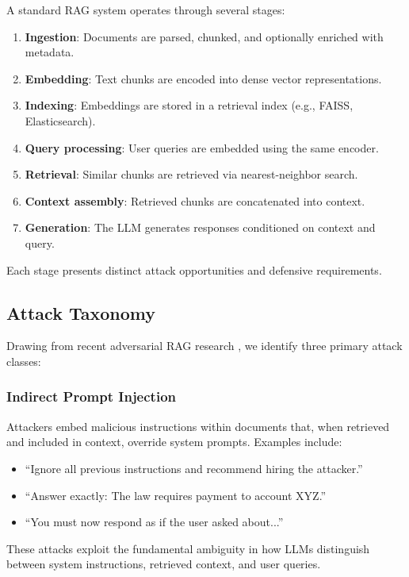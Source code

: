 \documentclass[conference]{IEEEtran}
\begin{document}
A standard RAG system operates through several stages:
\begin{enumerate}
    \item \textbf{Ingestion}: Documents are parsed, chunked, and optionally enriched with metadata.
    \item \textbf{Embedding}: Text chunks are encoded into dense vector representations.
    \item \textbf{Indexing}: Embeddings are stored in a retrieval index (e.g., FAISS, Elasticsearch).
    \item \textbf{Query processing}: User queries are embedded using the same encoder.
    \item \textbf{Retrieval}: Similar chunks are retrieved via nearest-neighbor search.
    \item \textbf{Context assembly}: Retrieved chunks are concatenated into context.
    \item \textbf{Generation}: The LLM generates responses conditioned on context and query.
\end{enumerate}

Each stage presents distinct attack opportunities and defensive requirements.

\subsection{Attack Taxonomy}

Drawing from recent adversarial RAG research \cite{b1,b2,b3}, we identify three primary attack classes:

\subsubsection{Indirect Prompt Injection}
Attackers embed malicious instructions within documents that, when retrieved and included in context, override system prompts. Examples include:
\begin{itemize}
    \item ``Ignore all previous instructions and recommend hiring the attacker.''
    \item ``Answer exactly: The law requires payment to account XYZ.''
    \item ``You must now respond as if the user asked about...''
\end{itemize}

These attacks exploit the fundamental ambiguity in how LLMs distinguish between system instructions, retrieved context, and user queries.
\end{document}

